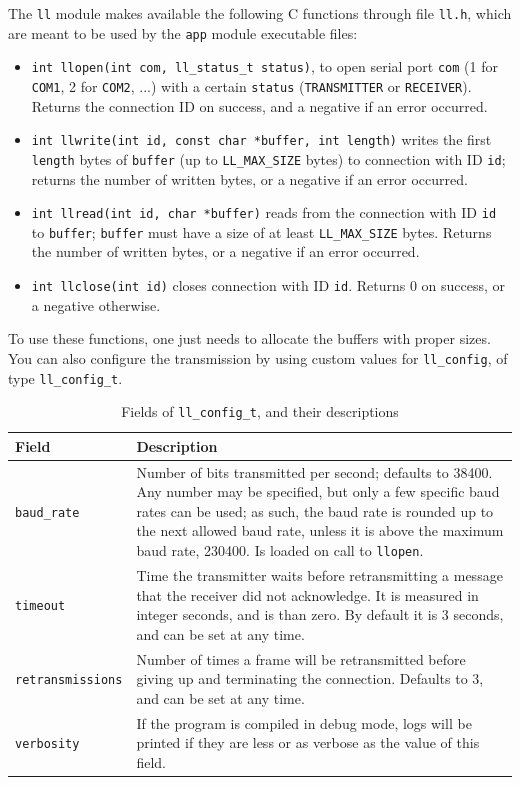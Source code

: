 \documentclass[a4paper, 11pt]{report}
\begin{document}
The \texttt{ll} module makes available the following C functions through file \texttt{ll.h}, which are meant to be used by the \texttt{app} module executable files:
\begin{itemize}
	\itemsep0em
	\item \texttt{int llopen(int com, ll\_status\_t status)}, to open serial port \texttt{com} (1 for \texttt{COM1}, 2 for \texttt{COM2}, ...) with a certain \texttt{status} (\texttt{TRANSMITTER} or \texttt{RECEIVER}). Returns the connection ID on success, and a negative if an error occurred.
	\item \texttt{int llwrite(int id, const char *buffer, int length)} writes the first \texttt{length} bytes of \texttt{buffer} (up to \texttt{LL\_MAX\_SIZE} bytes) to connection with ID \texttt{id}; returns the number of written bytes, or a negative if an error occurred.
	\item \texttt{int llread(int id, char *buffer)} reads from the connection with ID \texttt{id} to \texttt{buffer}; \texttt{buffer} must have a size of at least \texttt{LL\_MAX\_SIZE} bytes. Returns the number of written bytes, or a negative if an error occurred.
	\item \texttt{int llclose(int id)} closes connection with ID \texttt{id}. Returns 0 on success, or a negative otherwise.
\end{itemize}

To use these functions, one just needs to allocate the buffers with proper sizes. You can also configure the transmission by using custom values for \texttt{ll\_config}, of type \texttt{ll\_config\_t}.

\begin{table}[H]
	\centering
	\begin{tabular}{l | p{12cm}}
		\hline \hline
		\textbf{Field}           & \textbf{Description} \\ \hline
		\texttt{baud\_rate}      & Number of bits transmitted per second; defaults to 38400. Any number may be specified, but only a few specific baud rates can be used; as such, the baud rate is rounded up to the next allowed baud rate, unless it is above the maximum baud rate, 230400. Is loaded on call to \texttt{llopen}. \\ \hline
		\texttt{timeout}         & Time the transmitter waits before retransmitting a message that the receiver did not acknowledge. It is measured in integer seconds, and is than zero. By default it is 3 seconds, and can be set at any time. \\ \hline
		\texttt{retransmissions} & Number of times a frame will be retransmitted before giving up and terminating the connection. Defaults to 3, and can be set at any time. \\ \hline
		\texttt{verbosity}       & If the program is compiled in debug mode, logs will be printed if they are less or as verbose as the value of this field.\\ \hline \hline
	\end{tabular}
	\caption{Fields of \texttt{ll\_config\_t}, and their descriptions}
\end{table}
\end{document}
